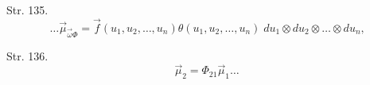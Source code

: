 \documentclass[a4paper,11pt]{article}
\begin{document}
\start Str. 135.
$$\ldots \vec{ \mu }_{ \vec{ \omega } \Phi } = \vec{ f }( u_{ 1 },
u_{ 2 }, \ldots, u_{ n } ) \theta( u_{ 1 }, u_{ 2 }, \ldots, u_{ n } )
\; du_{ 1 } \otimes du_{ 2 } \otimes \ldots \otimes du_{ n }
\textrm{,}$$

\start Str. 136.
$$\vec{ \mu }_{ 2 } = \Phi_{ 2 1 } \vec{ \mu }_{ 1 } \ldots$$





 {}




\end{document}
